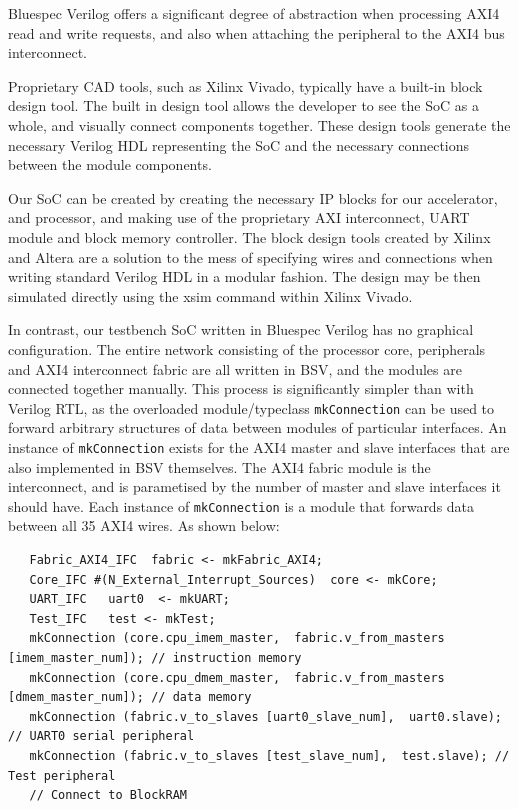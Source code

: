 \documentclass[a4paper,8pt]{report}
\begin{document}
Bluespec Verilog offers a significant degree of abstraction when processing AXI4
read and write requests, and also when attaching the peripheral to the AXI4 bus interconnect.


Proprietary CAD tools, such as Xilinx Vivado, typically have a built-in block
design tool. The built in design tool allows the developer to see the SoC as a
whole, and visually connect components together. These design tools generate the
necessary Verilog HDL representing the SoC and the necessary connections between
the module components.

Our SoC can be created by creating the necessary IP blocks for our accelerator,
and processor, and making use of the proprietary AXI interconnect, UART module
and block memory controller. The block design tools created by Xilinx and Altera
are a solution to the mess of specifying wires and connections when writing
standard Verilog HDL in a modular fashion. The design may be then simulated
directly using the xsim command within Xilinx Vivado.

In contrast, our testbench SoC written in Bluespec Verilog has no graphical
configuration. The entire network consisting of the processor core, peripherals
and AXI4 interconnect fabric are all written in BSV, and the modules are
connected together manually. This process is significantly simpler than with
Verilog RTL, as the overloaded module/typeclass \texttt{mkConnection} can be used to
forward arbitrary structures of data between modules of particular interfaces.
An instance of \texttt{mkConnection} exists for the AXI4 master and slave
interfaces that are also implemented in BSV themselves. The AXI4 fabric module
is the interconnect, and is parametised by the number of master and slave
interfaces it should have. Each instance of \texttt{mkConnection} is a module
that forwards data between all 35 AXI4 wires. As shown below:
\scriptsize
\begin{verbatim}
   Fabric_AXI4_IFC  fabric <- mkFabric_AXI4;
   Core_IFC #(N_External_Interrupt_Sources)  core <- mkCore;
   UART_IFC   uart0  <- mkUART;
   Test_IFC   test <- mkTest;
   mkConnection (core.cpu_imem_master,  fabric.v_from_masters [imem_master_num]); // instruction memory
   mkConnection (core.cpu_dmem_master,  fabric.v_from_masters [dmem_master_num]); // data memory
   mkConnection (fabric.v_to_slaves [uart0_slave_num],  uart0.slave); // UART0 serial peripheral
   mkConnection (fabric.v_to_slaves [test_slave_num],  test.slave); // Test peripheral
   // Connect to BlockRAM
\end{verbatim}
\normalsize
\end{document}
